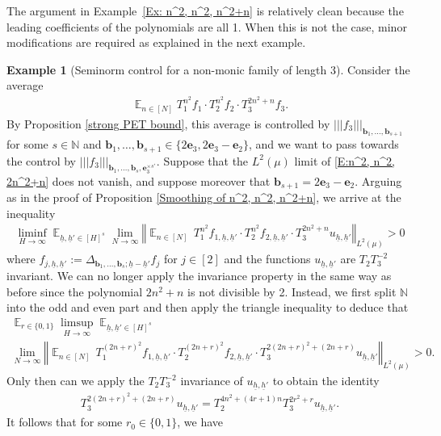 \documentclass[11pt]{amsart}
\theoremstyle{definition}
\newtheorem{example}{Example}
\newcommand{\N}{{\mathbb N}}
\newcommand{\be}{{\mathbf{e}}}
\renewcommand{\b}{{\textbf{b}}}
\newcommand{\uh}{{\underline{h}}}
\newcommand{\norm}[1]{\left\Vert #1\right\Vert}
\newcommand{\nnorm}[1]{\lvert\!|\!| #1|\!|\!\rvert}
\DeclareMathOperator*{\E}{\mathbb{E}}
\begin{document}
The argument in Example~\ref{Ex: n^2, n^2, n^2+n}
 is relatively clean because the leading coefficients of the polynomials are all 1. When this is not the case, minor modifications are required as explained in the next example.
\begin{example}[Seminorm control for a non-monic family of length 3]\label{Ex: n^2, n^2, 2n^2+n}
Consider the average
    \begin{align}\label{E:n^2, n^2, 2n^2+n}
    \E_{n\in[N]}T_1^{n^2} f_1 \cdot T_2^{n^2}f_2 \cdot T_3^{2n^2+n}f_3.
\end{align}
By Proposition \ref{strong PET bound}, this average is controlled by $\nnorm{f_3}_{\b_1, \ldots, \b_{s+1}}$ for some $s\in\N$ and $\b_1, \ldots, \b_{s+1}\in\{2\be_3, 2\be_3 - \be_2\}$, and we want to pass towards the control by $\nnorm{f_3}_{\b_1, \ldots, \b_s, \be_3^{\times s'}}$. Suppose that the $L^2(\mu)$ limit of \eqref{E:n^2, n^2, 2n^2+n} does not vanish, and suppose moreover that $\b_{s+1} = 2\be_3 - \be_2$. Arguing as in the proof of Proposition \ref{Smoothing of n^2, n^2, n^2+n}, we arrive at the inequality
\begin{align*}
    \liminf_{H\to\infty}\E_{\uh,\uh'\in [H]^{s}} \lim_{N\to\infty}\norm{ \E_{n\in[N]} \, T_1^{n^2} f_{1, \uh, \uh'}\cdot T_2^{n^2} f_{2, \uh, \uh'}\cdot T_3^{2n^2+n}u_{\uh,\uh'}}_{L^2(\mu)}>0
\end{align*}
where $f_{j, \uh, \uh'}:=\Delta_{\b_1, \ldots, \b_s; \uh-\uh'}f_j$ for $j\in[2]$ and the functions $u_{\uh, \uh'}$ are $T_2 T_3^{-2}$ invariant. We can no longer apply the invariance property in the same way as before since the polynomial $2n^2+n$ is not divisible by 2. Instead, we first split $\N$ into the odd and even part and then apply the triangle inequality to deduce that
\begin{multline*}%
    \E_{r\in\{0,1\}}\limsup_{H\to\infty}\E_{\uh,\uh'\in [H]^{s}}\\
    \lim_{N\to\infty}\norm{ \E_{n\in[N]} \, T_1^{(2n+r)^2} f_{1, \uh, \uh'}\cdot T_2^{(2n+r)^2} f_{2, \uh, \uh'}\cdot T_3^{2(2n+r)^2+(2n+r)}u_{\uh,\uh'}}_{L^2(\mu)}>0.
\end{multline*}
Only then can we apply the $T_2 T_3^{-2}$ invariance of $u_{\uh, \uh'}$ to obtain the identity
\begin{align*}
    T_3^{2(2n+r)^2+(2n+r)}u_{\uh,\uh'} = T_2^{4n^2 + (4r+1)n}T_3^{2r^2 + r}u_{\uh, \uh'}.
\end{align*}
It follows that for some $r_0\in \{0,1\}$, we have

\end{example}
\end{document}
